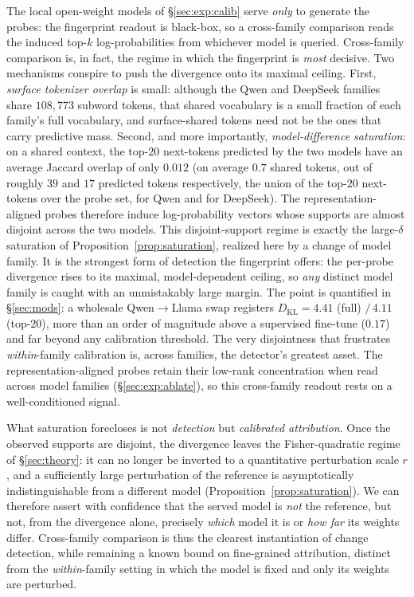 \documentclass[11pt]{article}
\theoremstyle{definition}
\begin{document}
The local open-weight models of \S\ref{sec:exp:calib} serve \emph{only} to
generate the probes: the fingerprint readout is black-box, so a cross-family
comparison reads the induced top-$k$ log-probabilities from whichever model is
queried. Cross-family comparison is, in fact, the regime in which the
fingerprint is \emph{most} decisive. Two mechanisms conspire to push the
divergence onto its maximal ceiling. First, \emph{surface tokenizer overlap} is
small: although the Qwen and DeepSeek families share $108{,}773$ subword
tokens, that shared vocabulary is a small fraction of each family's full
vocabulary, and surface-shared tokens need not be the ones that carry
predictive mass. Second, and more importantly, \emph{model-difference
saturation}: on a shared context, the top-$20$ next-tokens predicted by the two
models have an average Jaccard overlap of only $0.012$ (on average $0.7$ shared
tokens, out of roughly $39$ and $17$ predicted tokens respectively, the union
of the top-$20$ next-tokens over the probe set, for Qwen and for DeepSeek). The
representation-aligned probes therefore induce log-probability vectors whose
supports are almost disjoint across the two models. This disjoint-support regime
is exactly the large-$\delta$ saturation of Proposition~\ref{prop:saturation},
realized here by a change of model family. It is the strongest form of detection
the fingerprint offers: the per-probe divergence rises to its maximal,
model-dependent ceiling, so \emph{any} distinct model family is
caught with an unmistakably large margin. The point is quantified in
\S\ref{sec:mods}: a wholesale Qwen$\to$Llama swap registers $D_{\mathrm{KL}} =
4.41$ (full) $/\,4.11$ (top-$20$), more than an order of magnitude above a
supervised fine-tune ($0.17$) and far beyond any calibration threshold. The
very disjointness that frustrates \emph{within}-family calibration is, across
families, the detector's greatest asset. The representation-aligned probes
retain their low-rank concentration when read across model families
(\S\ref{sec:exp:ablate}), so this cross-family readout rests on a
well-conditioned signal.

What saturation forecloses is not \emph{detection} but \emph{calibrated
attribution}. Once the observed supports are disjoint, the divergence leaves the
Fisher-quadratic regime of \S\ref{sec:theory}: it can no longer be inverted to a
quantitative perturbation scale $r$, and a sufficiently large perturbation of
the reference is asymptotically indistinguishable from a different model
(Proposition~\ref{prop:saturation}). We can therefore assert with confidence
that the served model is \emph{not} the reference, but not, from the divergence
alone, precisely \emph{which} model it is or \emph{how far} its weights differ.
Cross-family comparison is thus the clearest instantiation of change detection,
while remaining a known bound on fine-grained attribution, distinct
from the \emph{within}-family setting in which the model is fixed and only its
weights are perturbed.
\end{document}
